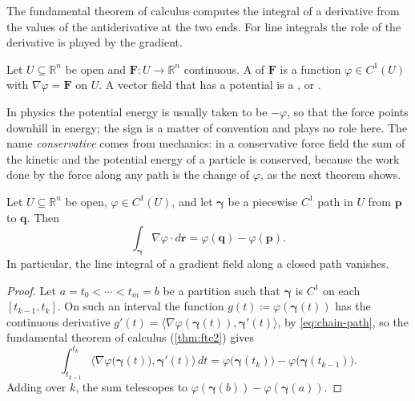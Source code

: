 The fundamental theorem of calculus computes the integral of a derivative from the values of the antiderivative at the two ends. For line integrals the role of the derivative is played by the gradient.

\begin{definition}
\label{def:potential}
Let $U\subseteq\mathbb R^n$ be open and $\mathbf F\colon U\to\mathbb R^n$ continuous. A  of $\mathbf F$ is a function $\varphi\in C^1(U)$ with $\nabla\varphi=\mathbf F$ on $U$. A vector field that has a potential is a , or .
\end{definition}

In physics the potential energy is usually taken to be $-\varphi$, so that the force points downhill in energy; the sign is a matter of convention and plays no role here. The name \emph{conservative} comes from mechanics: in a conservative force field the sum of the kinetic and the potential energy of a particle is conserved, because the work done by the force along any path is the change of $\varphi$, as the next theorem shows.

\begin{theorem}
\label{thm:ftc-line}
Let $U\subseteq\mathbb R^n$ be open, $\varphi\in C^1(U)$, and let $\boldsymbol\gamma$ be a piecewise $C^1$ path in $U$ from $\mathbf p$ to $\mathbf q$. Then
\[
\int_{\boldsymbol\gamma}\nabla\varphi\cdot d\mathbf r=\varphi(\mathbf q)-\varphi(\mathbf p).
\]
In particular, the line integral of a gradient field along a closed path vanishes.
\end{theorem}

\begin{proof}
Let $a=t_0<\cdots<t_m=b$ be a partition such that $\boldsymbol\gamma$ is $C^1$ on each $[t_{k-1},t_k]$. On such an interval the function $g(t)\coloneqq\varphi(\boldsymbol\gamma(t))$ has the continuous derivative $g'(t)=\langle\nabla\varphi(\boldsymbol\gamma(t)),\boldsymbol\gamma'(t)\rangle$, by \eqref{eq:chain-path}, so the fundamental theorem of calculus (\cref{thm:ftc2}) gives
\[
\int_{t_{k-1}}^{t_k}\bigl\langle\nabla\varphi\bigl(\boldsymbol\gamma(t)\bigr),\boldsymbol\gamma'(t)\bigr\rangle\,dt=\varphi\bigl(\boldsymbol\gamma(t_k)\bigr)-\varphi\bigl(\boldsymbol\gamma(t_{k-1})\bigr).
\]
Adding over $k$, the sum telescopes to $\varphi(\boldsymbol\gamma(b))-\varphi(\boldsymbol\gamma(a))$.
\end{proof}

